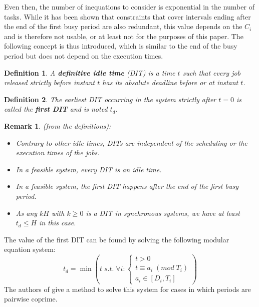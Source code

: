 \documentclass[times, 10pt,twocolumn, a4paper]{article}
\newtheorem{definition}{Definition}
\newtheorem{remark}{Remark}
\begin{document}
	Even then, the number of inequations to consider is exponential in the number
	of tasks. While it has been shown that constraints that cover intervals ending
	after the end of the first busy period are also redundant, this value depends on the $C_i$ and is
	therefore not usable, or at least not for the purposes of this paper. The
	following concept is thus introduced, which is similar to the end of the busy period but does not depend on the execution times.

	\begin{definition}
		A \textbf{definitive idle time} (DIT) is a time $t$ such that every job
		released strictly before instant $t$ has its absolute deadline before or at instant $t$.
	\end{definition}

	\begin{definition}
		The earliest DIT occurring in the system strictly after $t=0$ is called the
		\textbf{first DIT} and is noted $t_d$.
	\end{definition}

	\begin{remark} (from the definitions):
		\begin{itemize}
			\item Contrary to other idle times, DITs are independent of the
			scheduling or the execution times of the jobs.
			\item In a feasible system, every DIT is an idle time.
			\item In a feasible system, the first DIT happens after the end of the
			first busy period.
			\item As any $kH$ with $k \geqslant 0$ is a DIT in synchronous systems, we have at least $t_d
			\leqslant H$ in this case.
		\end{itemize}
	\end{remark}

	The value of the first DIT can be found by solving the following modular equation system:
	\[
		t_d = \min
		\left( t \; s.t. \; \forall i:
			\left\{
				\begin{array}{c}
					t > 0 \\
					t \equiv a_i \; (mod \; T_i) \\
					a_i \in [D_i, T_i]
				\end{array}
			\right.
		\right)
	\]
	The authors of \cite{george2009characterization} give a method to solve this system for cases in which periods are pairwise coprime.\\
\end{document}
